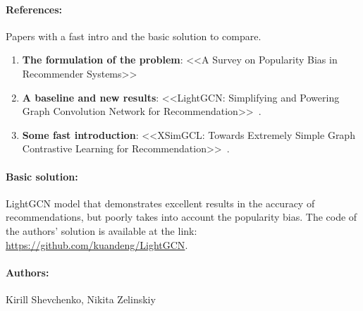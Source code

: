 \documentclass[12pt]{article}
\begin{document}
\paragraph{References:}  Papers with a fast intro and the basic solution to compare.
\begin{enumerate}
\item \textbf{The formulation of the problem}:
<<A Survey on Popularity Bias in Recommender Systems>>~\cite{Klimashevskaia2024}  
\item \textbf{A baseline and new results}:
<<LightGCN: Simplifying and Powering Graph Convolution Network for Recommendation>>~\cite{Huang2021}.
\item \textbf{Some fast introduction}:
<<XSimGCL: Towards Extremely Simple Graph Contrastive Learning for Recommendation>>~\cite{Yu2023}.
\end{enumerate}

\paragraph{Basic solution:} LightGCN model that demonstrates excellent results in the accuracy of recommendations, but poorly takes into account the popularity bias.
The code of the authors' solution is available at the link: \href{https://github.com/kuandeng/LightGCN}{https://github.com/kuandeng/LightGCN}.

\paragraph{Authors:} Kirill Shevchenko, Nikita Zelinskiy



\end{document}
